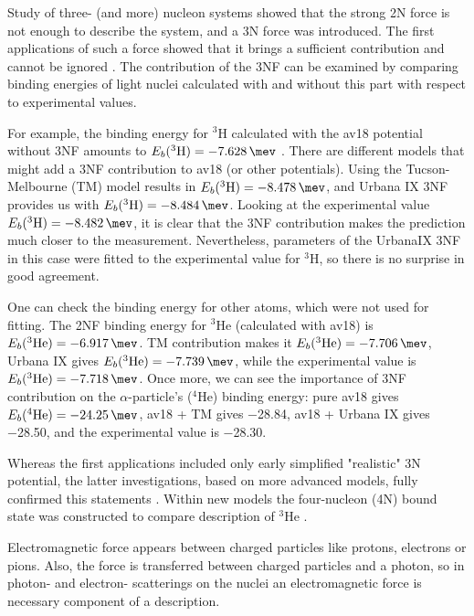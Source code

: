 Study of three- (and more) nucleon systems showed that
the strong 2N force is not enough to describe
the system, and a 3N force was introduced. The first applications of such
a force showed that it brings a
sufficient contribution and cannot be ignored \cite{GLOCKLE1982343}.
The contribution of the 3NF can be examined by
comparing binding energies of light nuclei calculated with
and without this part with respect to experimental values.

For example, the binding energy for $^3$H calculated with the \gls{av18} potential without 3NF amounts to
$E_b(^3\mathrm{H}) = \SI{-7.628}{\mev}$ \cite{NoggaAV18}. There are different models that might add a 3NF
contribution to \gls{av18} (or other potentials). Using the Tucson-Melbourne (TM) model \cite{Tucson-Melbourne}
results in $E_b(^3\mathrm{H}) = \SI{-8.478}{\mev}$, and Urbana IX \cite{Urbana3NF} 3NF provides us with
$E_b(^3\mathrm{H}) = \SI{-8.484}{\mev}$. Looking at the experimental value $E_b(^3\mathrm{H}) = \SI{-8.482}{\mev}$,
it is clear that the 3NF contribution makes the prediction much closer to the measurement. Nevertheless, parameters of the UrbanaIX
3NF in this case were fitted to the experimental value for $^3\mathrm{H}$, so there is no surprise in good agreement.

One can check the binding energy for other atoms, which were not used for fitting. The 2NF binding energy for $^3$He
(calculated with \gls{av18}) is $E_b(^3\mathrm{He}) = \SI{-6.917}{\mev}$. TM contribution makes it
$E_b(^3\mathrm{He}) = \SI{-7.706}{\mev}$, Urbana IX gives $E_b(^3\mathrm{He}) = \SI{-7.739}{\mev}$, while the
experimental value is $E_b(^3\mathrm{He}) = \SI{-7.718}{\mev}$. Once more, we can see the importance of 3NF
contribution on the $\alpha$-particle's ($^4\mathrm{He}$) binding energy: pure \gls{av18} gives
$E_b(^4\mathrm{He}) = \SI{-24.25}{\mev}$, \gls{av18} + TM gives \SI{-28.84}{\mev}, \gls{av18} + Urbana IX gives
\SI{-28.50}{\mev}, and the experimental value is \SI{-28.30}{\mev}.

Whereas the first applications included only early simplified "realistic" 3N potential, the latter
investigations, based on more advanced models, fully confirmed this statements \cite{StoksPhysRevC49, AV18Wiringa}.
Within new models the four-nucleon (4N) bound state was constructed to compare description of
$^3\mathrm{He}$ \cite{NoggaPhysRevLett}.

Electromagnetic force appears between charged particles like protons, electrons or pions.
Also, the force is transferred between charged particles and a photon, so 
in photon- and electron- scatterings on the nuclei an electromagnetic
force is necessary component of a description.

